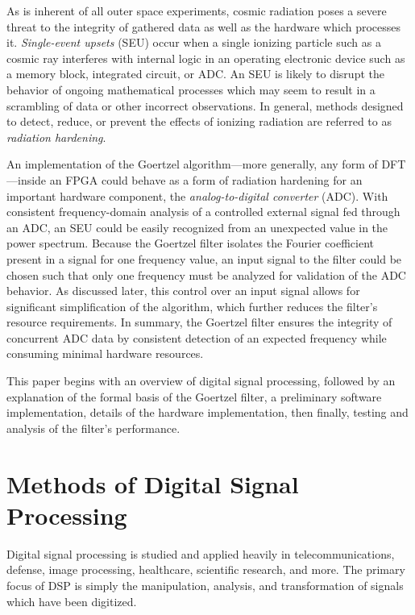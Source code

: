 \documentclass[reprint,amsmath,amssymb,aps,pra]{revtex4-2}
\begin{document}
As is inherent of all outer space experiments, cosmic radiation poses a severe threat to the integrity of gathered data as well as the hardware which processes it. \textit{Single-event upsets} (SEU) occur when a single ionizing particle such as a cosmic ray interferes with internal logic in an operating electronic device such as a memory block, integrated circuit, or ADC. An SEU is likely to disrupt the behavior of ongoing mathematical processes which may seem to result in a scrambling of data or other incorrect observations. In general, methods designed to detect, reduce, or prevent the effects of ionizing radiation are referred to as \textit{radiation hardening}.

An implementation of the Goertzel algorithm---more generally, any form of DFT---inside an FPGA could behave as a form of radiation hardening for an important hardware component, the \textit{analog-to-digital converter} (ADC). With consistent frequency-domain analysis of a controlled external signal fed through an ADC, an SEU could be easily recognized from an unexpected value in the power spectrum. Because the Goertzel filter isolates the Fourier coefficient present in a signal for one frequency value, an input signal to the filter could be chosen such that only one frequency must be analyzed for validation of the ADC behavior. As discussed later, this control over an input signal allows for significant simplification of the algorithm, which further reduces the filter's resource requirements. In summary, the Goertzel filter ensures the integrity of concurrent ADC data by consistent detection of an expected frequency while consuming minimal hardware resources.

This paper begins with an overview of digital signal processing, followed by an explanation of the formal basis of the Goertzel filter, a preliminary software implementation, details of the hardware implementation, then finally, testing and analysis of the filter's performance.

\section{Methods of Digital Signal Processing}

Digital signal processing is studied and applied heavily in telecommunications, defense, image processing, healthcare, scientific research, and more. The primary focus of DSP is simply the manipulation, analysis, and transformation of signals which have been digitized. 
\end{document}
